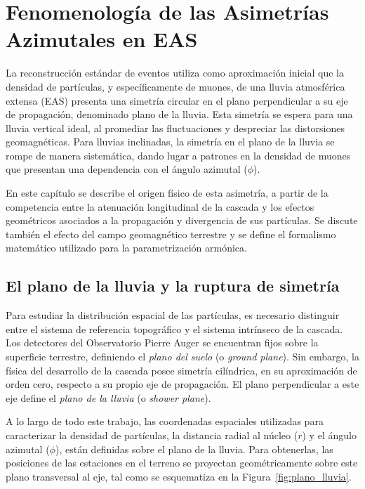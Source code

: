 
\section{Fenomenología de las Asimetrías Azimutales en EAS}
\label{sec:fenomenologia}

La reconstrucción estándar de eventos utiliza como aproximación inicial que la densidad de partículas, y específicamente de muones, de una lluvia atmosférica extensa (EAS) presenta una simetría circular en el plano perpendicular a su eje de propagación, denominado plano de la lluvia. Esta simetría se espera para una lluvia vertical ideal, al promediar las fluctuaciones y despreciar las distorsiones geomagnéticas. Para lluvias inclinadas, la simetría en el plano de la lluvia se rompe de manera sistemática, dando lugar a patrones en la densidad de muones que presentan una dependencia con el ángulo azimutal ($\phi$).

En este capítulo se describe el origen físico de esta asimetría, a partir de la competencia entre la atenuación longitudinal de la cascada y los efectos geométricos asociados a la propagación y divergencia de sus partículas. Se discute también el efecto del campo geomagnético terrestre y se define el formalismo matemático utilizado para la parametrización armónica.

\subsection{El plano de la lluvia y la ruptura de simetría}
\label{subsec:simetria_ruptura}

Para estudiar la distribución espacial de las partículas, es necesario distinguir entre el sistema de referencia topográfico y el sistema intrínseco de la cascada. Los detectores del Observatorio Pierre Auger se encuentran fijos sobre la superficie terrestre, definiendo el \textit{plano del suelo} (o \textit{ground plane}). Sin embargo, la física del desarrollo de la cascada posee simetría cilíndrica, en su aproximación de orden cero, respecto a su propio eje de propagación. El plano perpendicular a este eje define el \textit{plano de la lluvia} (o \textit{shower plane}).

A lo largo de todo este trabajo, las coordenadas espaciales utilizadas para caracterizar la densidad de partículas, la distancia radial al núcleo ($r$) y el ángulo azimutal ($\phi$), están definidas sobre el plano de la lluvia. Para obtenerlas, las posiciones de las estaciones en el terreno se proyectan geométricamente sobre este plano transversal al eje, tal como se esquematiza en la Figura~\ref{fig:plano_lluvia}.

